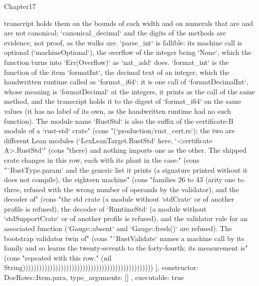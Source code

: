 \begin{lexlean}{Chapter17}
\begin{semanticmodule}
{{transcript holds them on the bounds of each width and on numerals that are and are not canonical; `canonical_decimal` and the digits of the methods are evidence, not proof, as the walks are. `parse_int` is fallible: its machine call is optional (`machineOptional`), the overflow of the integer being `None`, which the function turns into `Err(Overflow)` as `nat_add` does. `format_int` is the function of the item `formatInt`, the decimal text of an integer, which the handwritten runtime called as `format_i64`: it is one call of `formatDecimalInt`, whose meaning is `formatDecimal` at the integers, it prints as the call of the same method, and the transcript holds it to the digest of `format_i64` on the same values (it has no label of its own, as the handwritten runtime had no such function). The module name `RustStd` is also the suffix of the certificate-B module of a `rust-std` crate" (cons "(`production/rust_cert.rs`); the two are different Lean modules (`LexLeanTarget.RustStd` here, `<certificate A>.RustStd`" (cons "there) and nothing imports one as the other. The shipped crate changes in this row, each with its plant in the case:" (cons "`RustType.param` and the generic list it prints (a signature printed without it does not compile), the eighteen machine" (cons "families 26 to 43 (arity one to three, refused with the wrong number of operands by the validator), and the decoder of" (cons "the std crate (a module without `stdCrate` or of another profile is refused), the decoder of `RuntimeStd` (a module without `stdSupportCrate` or of another profile is refused), and the validator rule for an associated function (`Gauge::absent` and `Gauge::fresh()` are refused). The bootstrap validator twin of" (cons "`RustValidate` names a machine call by its family and so learns the twenty-seventh to the forty-fourth; its measurement is" (cons "repeated with this row." (nil String))))))))))))))))))))))))))))))))))))))))))))))))
    ],
    constructor: DocRows::Item.para,
    type_arguments: []
  },
  executable: true
}


\end{semanticmodule}
\end{lexlean}
